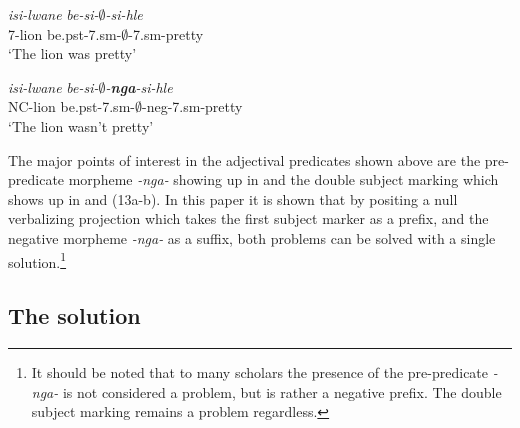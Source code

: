 \documentclass[output=paper]{langsci/langscibook}
\newcommand{\nga}[0]{\textit{-nga- }}
\begin{document}
\begin{exe}
\ex\label{ex:burkholder:13} \begin{xlist}
\ex\label{ex:burkholder:13a} \gll \textit{isi-lwane} \textit{be-si-$\emptyset$-si-hle}\\
       7-lion be.{\sc pst}-7.{\sc sm}-$\emptyset$-7.{\sc sm}-pretty\\
    \glt `The lion was pretty' 

\ex\label{ex:burkholder:13b} \gll \textit{isi-lwane} \textit{be-si-$\emptyset$-\textbf{nga}-si-hle}\\
       NC-lion be.{\sc pst}-7.{\sc sm}-$\emptyset$-{\sc neg}-7.{\sc sm}-pretty\\
    \glt `The lion wasn't pretty' 
\end{xlist}
\end{exe}

The major points of interest in the adjectival predicates shown above are the pre-predicate morpheme \nga showing up in  and the double subject marking which shows up in  and (13a-b). In this paper it is shown that by positing a null verbalizing projection which takes the first subject marker as a prefix, and the negative morpheme \nga as a suffix, both problems can be solved with a single solution.\footnote{It should be noted that to many scholars the presence of the pre-predicate \nga is not considered a problem, but is rather a negative prefix. The double subject marking remains a problem regardless.}

\subsection {The solution}\label{sec:burkholder:3.2}
\end{document}
